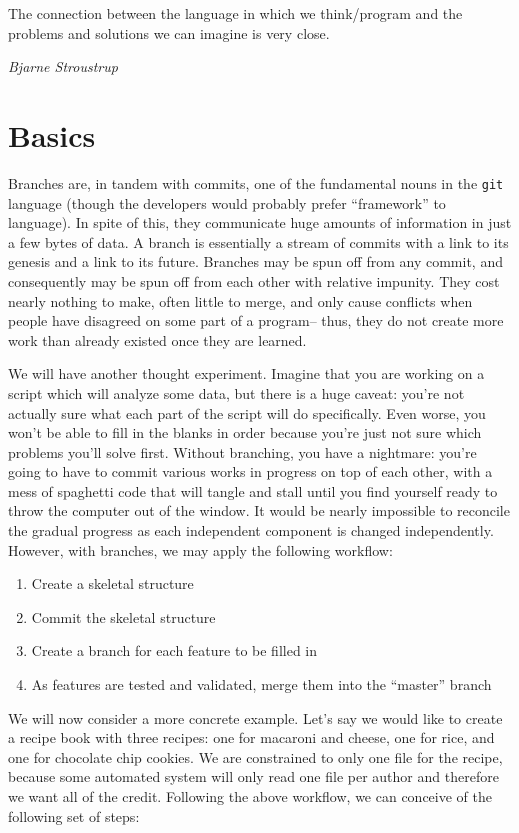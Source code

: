 \epigraph{The connection between the language in which we think/program and
the problems and solutions we can imagine is very close.}
{\textit{Bjarne Stroustrup}}

\section{Basics}
\par{
Branches are, in tandem with commits, one of the fundamental nouns in the
\verb+git+ language (though the developers would probably prefer ``framework''
to language). In spite of this, they communicate huge amounts of information
in just a few bytes of data. A branch is essentially a stream of commits with
a link to its genesis and a link to its future. Branches may be spun off from
any commit, and consequently may be spun off from each other with relative
impunity. They cost nearly nothing to make, often little to merge, and only
cause conflicts when people have disagreed on some part of a program-- thus,
they do not create more work than already existed once they are learned.
}

\par{
We will have another thought experiment. Imagine that you are working on a
script which will analyze some data, but there is a huge caveat: you're not
actually sure what each part of the script will do specifically. Even worse,
you won't be able to fill in the blanks in order because you're just not sure
which problems you'll solve first. Without branching, you have a nightmare:
you're going to have to commit various works in progress on top of each other,
with a mess of spaghetti code that will tangle and stall until you find
yourself ready to throw the computer out of the window. It would be nearly
impossible to reconcile the gradual progress as each independent component is
changed independently. However, with branches, we may apply the following
workflow:
}

\begin{enumerate}
    \item Create a skeletal structure
    \item Commit the skeletal structure
    \item Create a branch for each feature to be filled in
    \item As features are tested and validated, merge them into the ``master''
    branch
\end{enumerate}

\par{
We will now consider a more concrete example. Let's say we would like to
create a recipe book with three recipes: one for macaroni and cheese, one for
rice, and one for chocolate chip cookies. We are constrained to only one file
for the recipe, because some automated system will only read one file per
author and therefore we want all of the credit. Following the above workflow,
we can conceive of the following set of steps:
}

